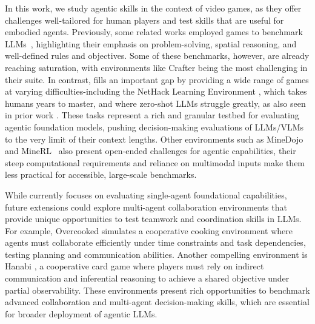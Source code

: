In this work, we study agentic skills in the context of video games, as they offer challenges well-tailored for human players and test skills that are useful for embodied agents. Previously, some related works employed games to benchmark LLMs~\citep{liu2023agentbench,todd2024missed,wu2023smartplay,ruoss2024lmact}, highlighting their emphasis on problem-solving, spatial reasoning, and well-defined rules and objectives. Some of these benchmarks, however, are already reaching saturation, with environments like Crafter being the most challenging in their suite. In contrast, \our{} fills an important gap by providing a wide range of games at varying difficulties-including the NetHack Learning Environment \citep{kuttler2020nethack}, which takes humans years to master, and where zero-shot LLMs struggle greatly, as also seen in prior work \citep{jeurissen2024playing}. These tasks represent a rich and granular testbed for evaluating agentic foundation models, pushing decision-making evaluations of LLMs/VLMs to the very limit of their context lengths. Other environments such as MineDojo~\citep{fan2022minedojo} and MineRL~\citep{guss2019minerl} also present open-ended challenges for agentic capabilities, their steep computational requirements and reliance on multimodal inputs make them less practical for accessible, large-scale benchmarks.

While \our{} currently focuses on evaluating single-agent foundational capabilities, future extensions could explore multi-agent collaboration environments that provide unique opportunities to test teamwork and coordination skills in LLMs. For example, Overcooked \citep{carroll2019utility, liu2023llm} simulates a cooperative cooking environment where agents must collaborate efficiently under time constraints and task dependencies, testing planning and communication abilities. Another compelling environment is Hanabi \citep{bard2020hanabi}, a cooperative card game where players must rely on indirect communication and inferential reasoning to achieve a shared objective under partial observability. These environments present rich opportunities to benchmark advanced collaboration and multi-agent decision-making skills, which are essential for broader deployment of agentic LLMs.









 


